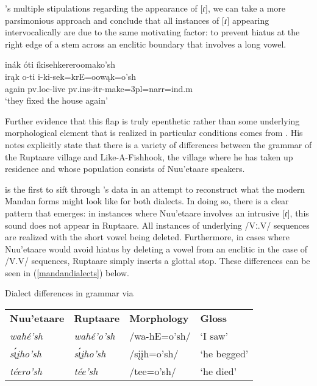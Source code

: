\citeauthor{hollow1970}'s multiple stipulations regarding the appearance of [ɾ], we can take a more parsimonious approach and conclude that all instances of [ɾ] appearing intervocalically are due to the same motivating factor: to prevent hiatus at the right edge of a stem across an enclitic boundary that involves a long vowel.

\begin{exe}

\item\label{theyfixedthehouseagain1} \glll inák óti íkisehkereroomako'sh\\
	irąk o-ti i-ki-sek=krE=oowąk=o'sh\\
	\textnormal{again} pv.loc-\textnormal{live} pv.ins-itr-\textnormal{make}=3pl=narr=ind.m\\
\glt	`they fixed the house again' \citep[157]{hollow1973a}

\end{exe}





Further evidence that this flap is truly epenthetic rather than some underlying morphological element that is realized in particular conditions comes from \citet{maximilian1839}. His notes explicitly state that there is a variety of differences between the grammar of the Ruptaare village and Like-A-Fishhook, the village where he has taken up residence and whose population consists of Nuu'etaare speakers.

 is the first to sift through \citeauthor{maximilian1839}'s data in an attempt to reconstruct what the modern Mandan forms might look like for both dialects. In doing so, there is a clear pattern that emerges: in instances where Nuu'etaare involves an intrusive [ɾ], this sound does not appear in Ruptaare. All instances of underlying /Vː.V/ sequences are realized with the short vowel being deleted. Furthermore, in cases where Nuu'etaare would avoid hiatus by deleting a vowel from an enclitic in the case of /V.V/ sequences, Ruptaare simply inserts a glottal stop. These differences can be seen in (\ref{mandandialects}) below.

\begin{exe}
\item\label{mandandialects} Dialect differences in  grammar via \citet[486]{carter1991a}

\begin{tabular}{llll}
\textbf{Nuu'etaare}&
	\textbf{Ruptaare}&
	\textbf{Morphology}&
	\textbf{Gloss}\\
\textit{wahé'sh}&
	\textit{wahé'o'sh}&
	/wa-hE=o'sh/&
	`I saw'\\
\textit{sı̨́įho'sh}&
	\textit{sı̨́įho'sh}&
	/sįįh=o'sh/&
	`he begged'\\
\textit{téero'sh}&
	\textit{tée'sh}&
	/tee=o'sh/&
	`he died'
\end{tabular}
\end{exe}

